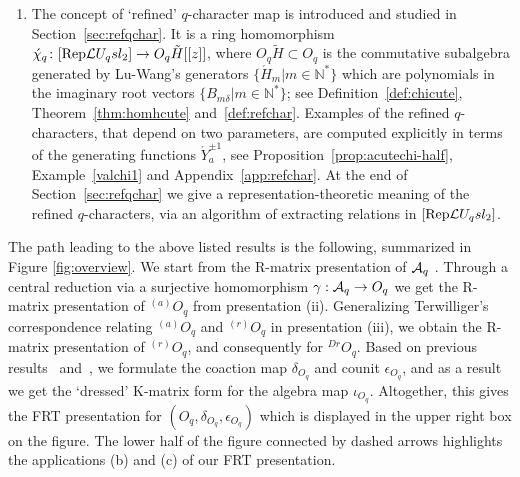 \documentclass[11pt]{amsart}
\numberwithin{equation}{section}
\numberwithin{equation}{section}
\begin{document}
\begin{enumerate}[label=(\alph*)]
\item  The concept of `refined' $q$-character map is introduced and studied in Section~\ref{sec:refqchar}. It is a ring homomorphism $\acute{\chi}_q\colon [\mathrm{Rep}\mathcal{L} U_q sl_2]\rightarrow  O_q\tilde{H}[[z]]$, where $O_q\widetilde{H}\subset O_q$ is the commutative subalgebra
generated by  Lu-Wang's generators $\{\acute{H}_m|m\in{\mathbb N}^*\}$ which are polynomials in the imaginary root vectors $\{B_{m\delta}|m\in{\mathbb N}^*\}$; see Definition~\ref{def:chicute}, Theorem~\ref{thm:homhcute} and~\eqref{def:refchar}.
Examples of the refined $q$-characters, that depend on two parameters, are computed explicitly in terms of the generating functions $\acute{Y}_a^{\pm 1}$, see Proposition~\ref{prop:acutechi-half}, Example~\ref{valchi1} and Appendix~\ref{app:refchar}. 
At the end of Section~\ref{sec:refqchar} we give a representation-theoretic meaning of the refined $q$-characters, via an algorithm of extracting relations in $[\mathrm{Rep}\mathcal{L} U_q sl_2]$. 
\end{enumerate}

The path leading to the above listed results is the following,  summarized in Figure \ref{fig:overview}. 
We start from the R-matrix presentation of ${\cal A}_q$ \cite{BSh1}. Through a central reduction via a surjective homomorphism 
$\gamma: {\cal A}_q \rightarrow O_q$ we get the R-matrix presentation of $^{(a)}O_q$ from presentation (ii). 
Generalizing Terwilliger's correspondence \cite{Ter21b}  relating $^{(a)}O_q$ and $^{(r)}O_q$ in presentation (iii), we obtain
 the R-matrix presentation of $^{(r)}O_q$, and consequently for $^{Dr}O_q$.
Based on previous results~\cite[Sec.\,6.2]{LBG} and~\cite[Sec.\,2]{BGL25}, we formulate the coaction map $\delta_{O_q}$ and counit $\epsilon_{O_q}$, and as a result we get the `dressed' K-matrix form for the algebra map $\iota_{O_q}$. Altogether, this gives the FRT presentation for $(O_q,\delta_{O_q},\epsilon_{O_q})$ which is displayed in the upper right box on the figure. The lower half of the figure connected by dashed arrows highlights the applications (b) and (c) of our FRT presentation.
\end{document}
